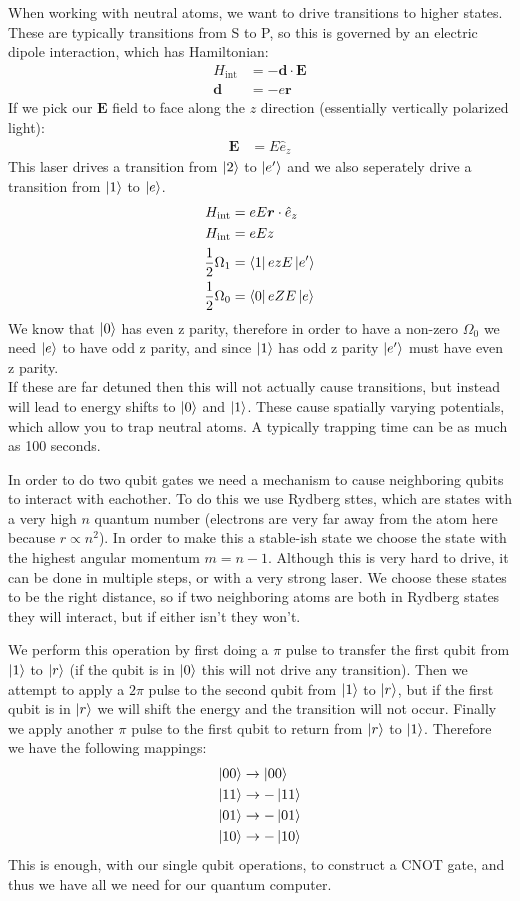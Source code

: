 When working with neutral atoms, we want to drive transitions to higher states. These are typically transitions from S to P, so this is governed by an electric dipole interaction, which has Hamiltonian:
\begin{align*}
	H_\text{int} &= -\bm{d}\cdot\bm{E} \\
	\bm{d} &= -e\bm{r}
\end{align*}
If we pick our $\bm{E}$ field to face along the $z$ direction (essentially vertically polarized light):
\begin{align*}
	\bm{E} &= E \hat{e}_z
\end{align*}
This laser drives a transition from $\ket{2}$ to $\ket{e'}$ and we also seperately drive a transition from $\ket{1}$ to $\ket{e}$.
\begin{align*}
	H_\text{int} &= eE\bm{r}\cdot\hat{e}_z \\
	H_\text{int} &= eEz \\
	\frac{1}{2}\Omega_1 &= \bra{1}ezE\ket{e'} \\
	\frac{1}{2}\Omega_0 &= \bra{0}eZE\ket{e}
\end{align*}
We know that $\ket{0}$ has even z parity, therefore in order to have a non-zero $\Omega_0$ we need $\ket{e}$ to have odd z parity, and since $\ket{1}$ has odd z parity $\ket{e'}$ must have even z parity. \\
If these are far detuned then this will not actually cause transitions, but instead will lead to energy shifts to $\ket{0}$ and $\ket{1}$.
These cause spatially varying potentials, which allow you to trap neutral atoms. A typically trapping time can be as much as 100 seconds.

In order to do two qubit gates we need a mechanism to cause neighboring qubits to interact with eachother. To do this we use Rydberg sttes, which are states with a very high $n$ quantum number (electrons are very far away from the atom here because $r \propto n^2$).
In order to make this a stable-ish state we choose the state with the highest angular momentum $m=n-1$. Although this is very hard to drive, it can be done in multiple steps, or with a very strong laser.
We choose these states to be the right distance, so if two neighboring atoms are both in Rydberg states they will interact, but if either isn't they won't.

We perform this operation by first doing a $\pi$ pulse to transfer the first qubit from $\ket{1}$ to $\ket{r}$ (if the qubit is in $\ket{0}$ this will not drive any transition).
Then we attempt to apply a $2\pi$ pulse to the second qubit from $\ket{1}$ to $\ket{r}$, but if the first qubit is in $\ket{r}$ we will shift the energy and the transition will not occur.
Finally we apply another $\pi$ pulse to the first qubit to return from $\ket{r}$ to $\ket{1}$. Therefore we have the following mappings:
\begin{align*}
	\ket{00} &\to \ket{00} \\
	\ket{11} &\to -\ket{11} \\
	\ket{01} &\to -\ket{01} \\
	\ket{10} &\to -\ket{10}
\end{align*}
This is enough, with our single qubit operations, to construct a CNOT gate, and thus we have all we need for our quantum computer.
